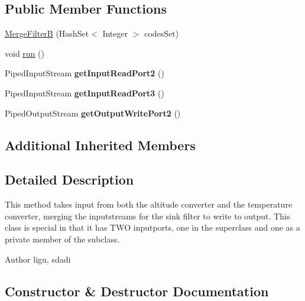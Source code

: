 \subsection*{Public Member Functions}
\begin{DoxyCompactItemize}
\item 
\hyperlink{class_system_b_1_1_merge_filter_b_a63a9b515974c72eed2f4611557d85e85}{Merge\+Filter\+B} (Hash\+Set$<$ Integer $>$ codes\+Set)
\item 
void \hyperlink{class_system_b_1_1_merge_filter_b_a18f632bbeb40a6ffcbc1233683eceae4}{run} ()
\item 
\hypertarget{class_system_b_1_1_merge_filter_b_a618b23403c269d797e562d2650151fd1}{}Piped\+Input\+Stream {\bfseries get\+Input\+Read\+Port2} ()\label{class_system_b_1_1_merge_filter_b_a618b23403c269d797e562d2650151fd1}

\item 
\hypertarget{class_system_b_1_1_merge_filter_b_ae5c644c8852622de146568300fb6a290}{}Piped\+Input\+Stream {\bfseries get\+Input\+Read\+Port3} ()\label{class_system_b_1_1_merge_filter_b_ae5c644c8852622de146568300fb6a290}

\item 
\hypertarget{class_system_b_1_1_merge_filter_b_a30528d993a48d0d2eb2bc747b2b4b6a1}{}Piped\+Output\+Stream {\bfseries get\+Output\+Write\+Port2} ()\label{class_system_b_1_1_merge_filter_b_a30528d993a48d0d2eb2bc747b2b4b6a1}

\end{DoxyCompactItemize}
\subsection*{Additional Inherited Members}


\subsection{Detailed Description}
This method takes input from both the altitude converter and the temperature converter, merging the inputstreams for the sink filter to write to output. This class is special in that it has T\+W\+O inputports, one in the superclass and one as a private member of the subclass. \begin{DoxyAuthor}{Author}
ligu, sdadi 
\end{DoxyAuthor}


\subsection{Constructor \& Destructor Documentation}
\hypertarget{class_system_b_1_1_merge_filter_b_a63a9b515974c72eed2f4611557d85e85}{}
